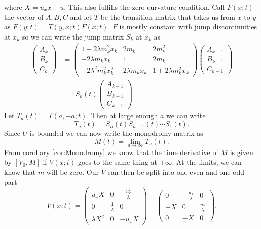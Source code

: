 \documentclass[english,master]{liumaiex}
\theoremstyle{plain}
\theoremstyle{definition}
\begin{document}
where $X = u_x x - u$. This also fulfills the zero curvature condition. Call $F(x;t)$ the vector of $A, B, C$ and let $T$ be the transition matrix that takes us from $x$ to $y$ as $F(y;t) = T(y,x;t)F(x;t)$. $F$ is mostly constant with jump discontinuities at $x_k$ so we can write the jump matrix $S_k$ at $x_k$ as
\begin{equation}
\begin{aligned}
\begin{pmatrix} A_k \\ B_k \\ C_k \end{pmatrix} &= 
\begin{pmatrix}
	1 - 2\lambda m_k^2 x_k & 2m_k & 2m_k^2 \\
	-2\lambda m_k x_k & 1 & 2m_k \\
	-2\lambda^2 m_k^2 x_k^2 & 2\lambda m_k x_k & 1 + 2\lambda m_k^2 x_k
\end{pmatrix}
\begin{pmatrix} A_{k-1} \\ B_{k-1} \\ C_{k-1} \end{pmatrix} \\
&=: S_k(t) 
\begin{pmatrix} A_{k-1} \\ B_{k-1} \\ C_{k-1} \end{pmatrix}
\end{aligned}
\end{equation}
Let $T_a(t) = T(a,-a;t)$. Then at large enough $a$ we can write 
\begin{equation}
	T_a(t) = S_n(t)S_{n-1}(t) \cdots S_1(t).
\end{equation}
Since $U$ is bounded we can now write the monodromy matrix as
\begin{equation}
	M(t) = \lim_{a \rightarrow \infty} T_a(t).
\end{equation}
From corollary \ref{cor:Monodromy} we know that the time derivative of $M$ is given by $[V_0, M]$ if $V(x;t)$ goes to the same thing at $\pm \infty$. At the limits, we can know that $m$ will be zero. Our $V$ can then be split into one even and one odd part
\begin{equation}
	V(x;t) =
\begin{pmatrix}
	u_x X & 0 & -\frac{u_x^2}{\lambda} \\
	0 & \frac{1}{\lambda} & 0 \\
	\lambda X^2 & 0 & -u_x X
\end{pmatrix} +
\begin{pmatrix}
	0  & -\frac{u_x}{\lambda} & 0 \\
	-X & 0 & \frac{u_x}{\lambda} \\
	0 & -X & 0
\end{pmatrix}.
\end{equation}
\end{document}
